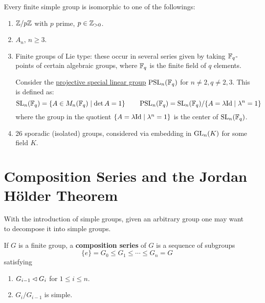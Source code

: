 \documentclass{article}
\begin{document}
\begin{theorem}
    Every finite simple group is isomorphic to one of the followings:
    \begin{enumerate}
        \item $\mathbb{Z}/p\mathbb{Z}$ with $p$ prime, $p \in \mathbb{Z}_{> 0}$.
        \item $A_n$, $n \geq 3$.
        \item Finite groups of Lie type: these occur in several series given by taking $\mathbb{F}_q$-points of certain algebraic groups, where $\mathbb{F}_q$ is the finite field of $q$ elements.
        \begin{example}
            Consider the \underline{projective special linear group} $\operatorname{PSL}_n(\mathbb{F}_q)$ for $n \neq 2, q \neq 2, 3$. This is defined as:
            \[
                \operatorname{SL}_n(\mathbb{F}_q) = \{A \in M_n(\mathbb{F}_q) \mid \det A = 1\} \qquad \operatorname{PSL}_n(\mathbb{F}_q) = \operatorname{SL}_n(\mathbb{F}_q)/\{A = \lambda \mathrm{Id} \mid \lambda^n = 1\}
            \]
            where the group in the quotient $\{A = \lambda \mathrm{Id} \mid \lambda^n = 1\}$ is the center of $\operatorname{SL}_n(\mathbb{F}_q)$.
        \end{example}
        \item 26 sporadic (isolated) groups, considered via embedding in $\mathrm{GL}_n(K)$ for some field $K$. 
    \end{enumerate}
\end{theorem}

\section{Composition Series and the Jordan H\"older Theorem}

\textstart
With the introduction of simple groups, given an arbitrary group one may want to decompose it into simple groups.

\begin{definition}
    If $G$ is a finite group, a \textbf{composition series} of $G$ is a sequence of subgroups
    \[
        \{e\} = G_0 \leq G_1 \leq \cdots \leq G_n = G
    \]
    satisfying
    \begin{enumerate}[label=\arabic*)]
        \item $G_{i-1} \lhd G_i$ for $1 \leq i \leq n$.
        \item $G_i/G_{i-1}$ is simple.
    \end{enumerate}
\end{definition}
\end{document}
